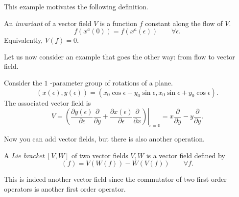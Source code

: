 This example motivates the following definition.
\begin{definition}[invariant]
  An \emph{invariant} of a vector field $V$ is a function $f$ constant along the flow of $V$.
  \begin{equation}
    f(x^{a}(0)) = f(x^{a}(\epsilon)) \qquad \forall \epsilon.
  \end{equation}
  Equivalently, $V(f) = 0$.
\end{definition}

Let us now consider an example that goes the other way: from flow to vector field.
\begin{example}
  Consider the $1$ -parameter group of rotations of a plane.
  \begin{equation}
    (x( \epsilon), y(\epsilon)) = (x_0 \cos\epsilon - y_0 \sin \epsilon, x_0 \sin \epsilon + y_0 \cos \epsilon).
  \end{equation}
  The associated vector field is
  \begin{equation}
  V = \left.\left( \frac{\partial y(\epsilon)}{\partial \epsilon} \frac{\partial }{\partial y} + \frac{\partial x(\epsilon)}{\partial \epsilon} \frac{\partial }{\partial x} \right)\right\rvert_{\epsilon = 0} = x \frac{\partial }{\partial y} - y \frac{\partial }{\partial y}.
  \end{equation}
\end{example}

Now you can add vector fields, but there is also another operation.
\begin{definition}
  A \emph{Lie bracket} $[V, W]$ of two vector fields $V, W$ is a vector field defined by
  \begin{equation}
    [V, W](f) = V(W(f)) - W(V(f)) \qquad \forall f.
  \end{equation}
\end{definition}
\begin{leftbar}
  This is indeed another vector field since the commutator of two first order operators is another first order operator.
\end{leftbar}

